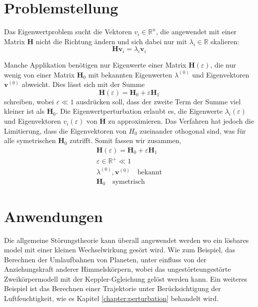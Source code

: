 %
%
%
\section{Problemstellung
\label{ew:section:problemstellung}}

Das Eigenwertproblem sucht die Vektoren $v_i \in \mathbb{R}^{n} $, die angewendet mit einer Matrix $\bm H$ nicht die Richtung ändern und sich dabei nur mit $\lambda_i \in \mathbb{R}$ skalieren:
\begin{equation} 
    \bm H \bm v_i = \lambda_i \bm v_i \label{ew:eq:eig}
\end{equation}

Manche Applikation benötigen nur Eigenwerte einer Matrix $\bm H(\varepsilon)$, die nur wenig von einer Matrix $\bm H_0$ mit bekannten Eigenwerten $\lambda^{(0)}$ und Eigenvektoren $\bm v^{(0)}$ abweicht.
Dies lässt sich mit der Summe
\begin{equation}
    \bm H(\varepsilon) = \bm H_0 + \varepsilon \bm H_1
\end{equation}
schreiben, wobei $\varepsilon \ll 1 $ ausdrücken soll, dass der zweite Term der Summe viel kleiner ist als $\bm H_0$.
Die Eigenwertperturbation erlaubt es, die Eigenwerte $\lambda_i(\varepsilon)$ und Eigenvektoren  $v_i(\varepsilon)$ von $\bm H$ zu approximieren.
Das Verfahren hat jedoch die Limitierung, dass die Eigenvektoren von $H_0$ zueinander othogonal sind, was für alle symetrischen $\bm H_0$ zutrifft.
Somit fassen wir zusammen,
\begin{gather*}
    \bm H(\varepsilon) = \bm H_0 + \varepsilon \bm H_1 \\
    \varepsilon \in \mathbb{R^+} \ll 1 \\
    \lambda^{(0)}, \bm v^{(0)} \quad \text{bekannt} \\
    \bm H_0 \quad \text{symetrisch}
\end{gather*} %

\section{Anwendungen}

Die allgemeine Störungstheorie kann überall angewendet werden wo ein lösbares model mit einer kleinen Wechselwirkung gesört wird.
Wie zum Beispiel, das Berechnen der Umlaufbahnen von Planeten, unter einfluss von der Anziehungskraft anderer Himmelskörpern, wobei das ungestörteungestörte Zweikörpermodell mit der Keppler-Ggleichung gelöst werden kann.  
Ein weiteres Beispiel ist das Berechnen einer Trajektorie unter Berücksichtigung der Luftfeuchtigkeit, wie es Kapitel \ref{chapter:perturbation} behandelt wird.

